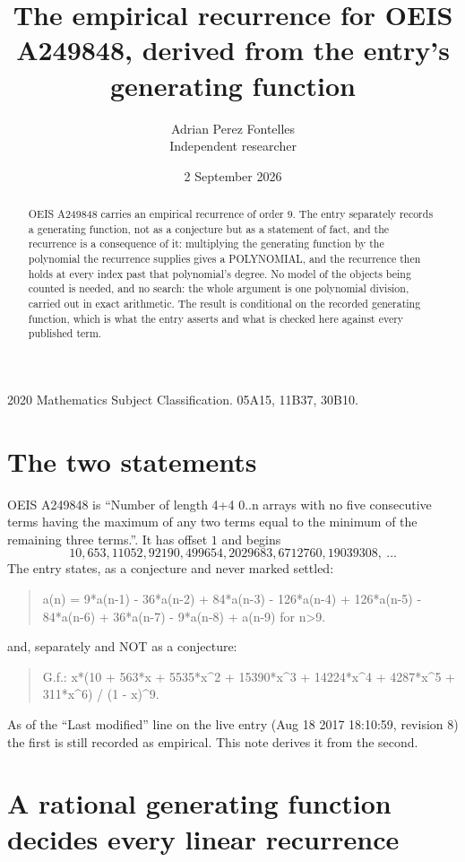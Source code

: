 \documentclass[11pt,a4paper]{article}
\title{The empirical recurrence for OEIS A249848, derived from the entry's generating function}
\author{Adrian Perez Fontelles\\ \small Independent researcher}
\date{2 September 2026}
\theoremstyle{plain}
\theoremstyle{definition}
\begin{document}
\maketitle

\begin{abstract}
OEIS A249848 carries an empirical recurrence of order $9$. The entry separately records a
generating function, not as a conjecture but as a statement of fact, and the recurrence is a
consequence of it: multiplying the generating function by the polynomial the recurrence
supplies gives a POLYNOMIAL, and the recurrence then holds at every index past that
polynomial's degree. No model of the objects being counted is needed, and no search: the
whole argument is one polynomial division, carried out in exact arithmetic. The result is
conditional on the recorded generating function, which is what the entry asserts and what is
checked here against every published term.
\end{abstract}

\noindent\small 2020 Mathematics Subject Classification. 05A15, 11B37, 30B10.\normalsize

\section{The two statements}

OEIS A249848 is ``Number of length 4+4 0..n arrays with no five consecutive terms having the maximum of any two terms equal to the minimum of the remaining three terms.''. It has offset $1$ and begins
\[
10, 653, 11052, 92190, 499654, 2029683, 6712760, 19039308,\ \dots
\]
The entry states, as a conjecture and never marked settled:
\begin{quote}
a(n) = 9*a(n-1) - 36*a(n-2) + 84*a(n-3) - 126*a(n-4) + 126*a(n-5) - 84*a(n-6) + 36*a(n-7) - 9*a(n-8) + a(n-9) for n>9.
\end{quote}
and, separately and NOT as a conjecture:
\begin{quote}
G.f.: x*(10 + 563*x + 5535*x\^{}2 + 15390*x\^{}3 + 14224*x\^{}4 + 4287*x\^{}5 + 311*x\^{}6) / (1 - x)\^{}9.
\end{quote}
As of the ``Last modified'' line on the live entry (Aug 18 2017 18:10:59, revision 8) the first is still
recorded as empirical. This note derives it from the second.

\section{A rational generating function decides every linear recurrence}
\end{document}
